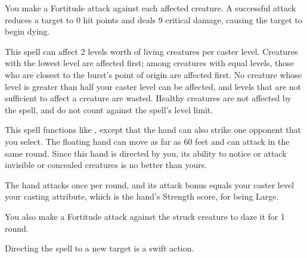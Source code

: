 \spellrng{\rngmed}
\begin{spellblood}
    You make a Fortitude attack against each affected creature. A successful attack reduces a target to 0 hit points and deals 9 critical damage, causing the target to begin dying.
\end{spellblood}
\begin{spellnotes}
  This spell can affect 2 levels worth of living creatures per caster level. Creatures with the lowest level are affected first; among creatures with equal levels, those who are closest to the burst's point of origin are affected first. No creature whose level is greater than half your caster level can be affected, and levels that are not sufficient to affect a creature are wasted. Healthy creatures are not affected by the spell, and do not count against the spell's level limit.
\end{spellnotes}

\begin{spelleffect}
  This spell functions like , except that the hand can also strike one opponent that you select. The floating hand can move as far as 60 feet and can attack in the same round. Since this hand is directed by you, its ability to notice or attack invisible or concealed creatures is no better than yours.
  \par The hand attacks once per round, and its attack bonus equals your caster level \add your casting attribute, which is the hand's Strength score,  for being Large.
\end{spelleffect}
\begin{spellblood}
  You also make a Fortitude attack against the struck creature to daze it for 1 round.
\end{spellblood}
\begin{spellnotes}
  Directing the spell to a new target is a swift action.
\end{spellnotes}

